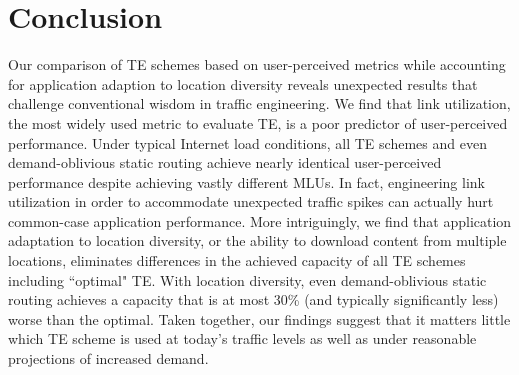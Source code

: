 \section{Conclusion}
\label{sec:conclusion}

Our comparison of TE schemes based on user-perceived metrics while accounting for application adaption to location diversity reveals unexpected results that challenge conventional wisdom in traffic engineering. 
We find that link utilization, the most widely used metric to evaluate TE, is a poor predictor of user-perceived performance. 
Under typical Internet load conditions, all TE schemes and even demand-oblivious static routing achieve nearly identical user-perceived performance despite achieving vastly different MLUs.  In fact, engineering link utilization in order to accommodate unexpected traffic spikes  can actually hurt common-case application performance. 
More intriguingly, we find that application adaptation to location diversity, or the ability to download content from multiple locations, eliminates differences in the achieved capacity of all TE schemes including ``optimal" TE. With location diversity, even demand-oblivious static routing achieves a capacity that is at most 30\% (and typically significantly less) worse than the optimal. Taken together, our findings suggest that it matters little which TE scheme is used at today's traffic levels as well as under reasonable projections of increased demand. 





